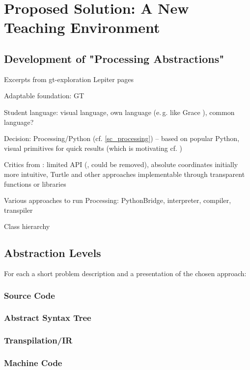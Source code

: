 
\chapter{Proposed Solution: A New Teaching Environment} \label{ch_pa}

\section{Development of "Processing Abstractions"}
Excerpts from gt-exploration Lepiter pages

\begin{todo}
\item Adaptable foundation: GT
\item Student language: visual language, own language (e.\,g. like Grace \cite{Bla18}), common language?
\item Decision: Processing/Python (cf. \ref{sc_processing}) -- based on popular Python, visual primitives for quick results (which is motivating cf. \cite{Chi23})
\item Critics from \cite{Chi23}: limited API (,  could be removed), absolute coordinates initially more intuitive, Turtle and other approaches implementable through transparent functions or libraries
\item Various approaches to run Processing: PythonBridge, interpreter, compiler, transpiler
\item Class hierarchy
\end{todo}


\section{Abstraction Levels}
For each a short problem description and a presentation of the chosen approach:

\subsection{Source Code}
\subsection{Abstract Syntax Tree}
\subsection{Transpilation/IR}
\subsection{Machine Code}
